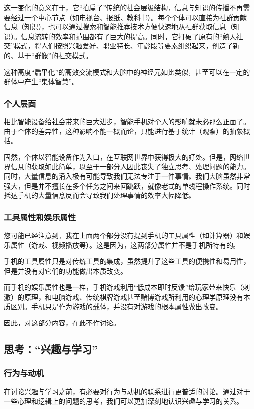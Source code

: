             这一变化的意义在于，它“拍扁了”传统的社会层级结构，信息与知识的传播不再需要经过一个中心节点（如电视台、报纸、教科书）。每个个体可以直接为社群贡献信息（知识），也可以通过搜索和智能推荐技术方便快速地从社群获取信息（知识）。信息流转的效率和范围都有了巨大的提高。同时，它打破了原有的“熟人社交”模式，将人们按照兴趣爱好、职业特长、年龄段等要素组织起来，创造了新的、基于“群像”的社交模式。
            
            这种高度“扁平化”的高效交流模式和大脑中的神经元如此类似，甚至可以在一定的群体中产生“集体智慧”。

        \subsubsection*{个人层面}
            相比智能设备给社会带来的巨大进步，智能手机对个人的影响就未必那么正面了。由于个体的差异性，这种影响不能一概而论，只能进行基于统计（观察）的抽象概括。

            固然，个体以智能设备作为入口，在互联网世界中获得极大的好处。但是，网络世界信息的获取如此简单，以至于一部分人因此丧失了独立思考、处理问题的能力。同时，大量信息的涌入极有可能导致我们无法专注于一件事情。我们大脑虽然非常强大，但是并不擅长在多个任务之间来回跳跃，就像老式的单线程操作系统。同时抵达手机的大量信息反而会导致我们处理事情的效率大幅降低。

        \subsubsection*{工具属性和娱乐属性}
            您可能已经注意到，我在上面两个部分没有提到手机的工具属性（如计算器）和娱乐属性（游戏、视频播放等）。这是因为，这两部分属性并不是手机所特有的。
            
            手机的工具属性只是对传统工具的集成，虽然提升了这些工具的便携性和易用性，但是并没有对它们的功能做出本质改变。

            而手机的娱乐属性也是一样，手机游戏利用“低成本即时反馈”给玩家带来快乐（刺激）的原理，和电脑游戏、传统棋牌游戏甚至赌博游戏所利用的心理学原理没有本质区别。手机只是作为游戏的载体，并没有对游戏的根本属性做出改变。

            因此，对这部分内容，在此不作讨论。

    \subsection{思考：“兴趣与学习”}
        \subsubsection*{行为与动机}
            在讨论兴趣与学习之前，有必要对行为与动机的联系进行更普适的讨论。通过对于一些心理和逻辑上的问题的思考，我们可以更加深刻地认识兴趣与学习的关系。
            
